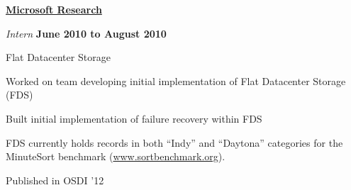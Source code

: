 \documentclass[10pt]{article}
\renewcommand{\section}[2]%
        {\pagebreak[2]\vspace{1.3\baselineskip}%
         \phantomsection\addcontentsline{toc}{section}{#1}%
         \hspace{0in}%
         \marginpar{
         \raggedright \scshape #1}#2}
\newenvironment{outerlist}[1][\enskip\textbullet]%
        {\begin{itemize}[#1]}{\end{itemize}%
         \vspace{-.6\baselineskip}}
\newenvironment{innerlist}[1][\enskip\textbullet]%
        {\begin{compactitem}[#1]}{\end{compactitem}}
\begin{document}
\bigskip

\href{http://research.microsoft.com}{\textbf{Microsoft Research}}
\begin{outerlist}

\item[] \textit{Intern}
    \hfill \textbf{June 2010 to August 2010}
    \begin{innerlist}
        \item Flat Datacenter Storage
        \begin{innerlist}
           \item Worked on team developing initial implementation of Flat
Datacenter Storage (FDS)
           \item Built initial implementation of failure recovery within
FDS
           \item FDS currently holds records in both ``Indy'' and
``Daytona'' categories for the MinuteSort benchmark
(\href{http://www.sortbenchmark.org}{www.sortbenchmark.org}).
           \item Published in OSDI '12
        \end{innerlist}
     \end{innerlist}
\end{outerlist}

\begin{comment}

\section{Technical\\Skills}
C, C++, x86 assembly, Java, Python, PHP

\bigskip

Kernel hacking, parallel programming

\bigskip

Data analysis and graphing with the R
software environment for statistical computing

\section{References}
\end{comment}
\end{document}

